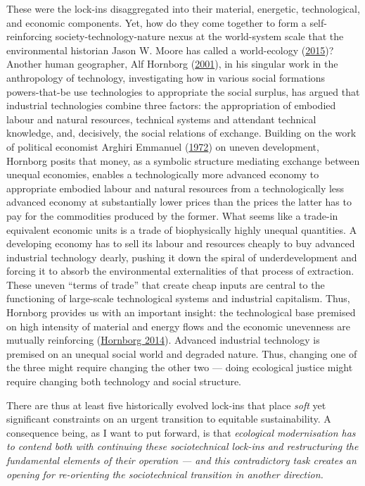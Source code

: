 \documentclass[a4paper, nobind]{templates/ociamthesis}
\begin{document}
These were the lock-ins disaggregated into their material, energetic, technological, and economic components. Yet, how do they come together to form a self-reinforcing society-technology-nature nexus at the world-system scale that the environmental historian Jason W. Moore has called a world-ecology (\protect\hyperlink{ref-moore_capitalism_2015}{2015})? Another human geographer, Alf Hornborg (\protect\hyperlink{ref-hornborg_power_2001}{2001}), in his singular work in the anthropology of technology, investigating how in various social formations powers-that-be use technologies to appropriate the social surplus, has argued that industrial technologies combine three factors: the appropriation of embodied labour and natural resources, technical systems and attendant technical knowledge, and, decisively, the social relations of exchange. Building on the work of political economist Arghiri Emmanuel (\protect\hyperlink{ref-emmanuel_unequal_1972}{1972}) on uneven development, Hornborg posits that money, as a symbolic structure mediating exchange between unequal economies, enables a technologically more advanced economy to appropriate embodied labour and natural resources from a technologically less advanced economy at substantially lower prices than the prices the latter has to pay for the commodities produced by the former. What seems like a trade-in equivalent economic units is a trade of biophysically highly unequal quantities. A developing economy has to sell its labour and resources cheaply to buy advanced industrial technology dearly, pushing it down the spiral of underdevelopment and forcing it to absorb the environmental externalities of that process of extraction. These uneven ``terms of trade'' that create cheap inputs are central to the functioning of large-scale technological systems and industrial capitalism. Thus, Hornborg provides us with an important insight: the technological base premised on high intensity of material and energy flows and the economic unevenness are mutually reinforcing (\protect\hyperlink{ref-hornborg_ecological_2014}{Hornborg 2014}). Advanced industrial technology is premised on an unequal social world and degraded nature. Thus, changing one of the three might require changing the other two --- doing ecological justice might require changing both technology and social structure.

There are thus at least five historically evolved lock-ins that place \emph{soft} yet significant constraints on an urgent transition to equitable sustainability. A consequence being, as I want to put forward, is that \emph{ecological modernisation has to contend both with continuing these sociotechnical lock-ins and restructuring the fundamental elements of their operation --- and this contradictory task creates an opening for re-orienting the sociotechnical transition in another direction.}
\end{document}
